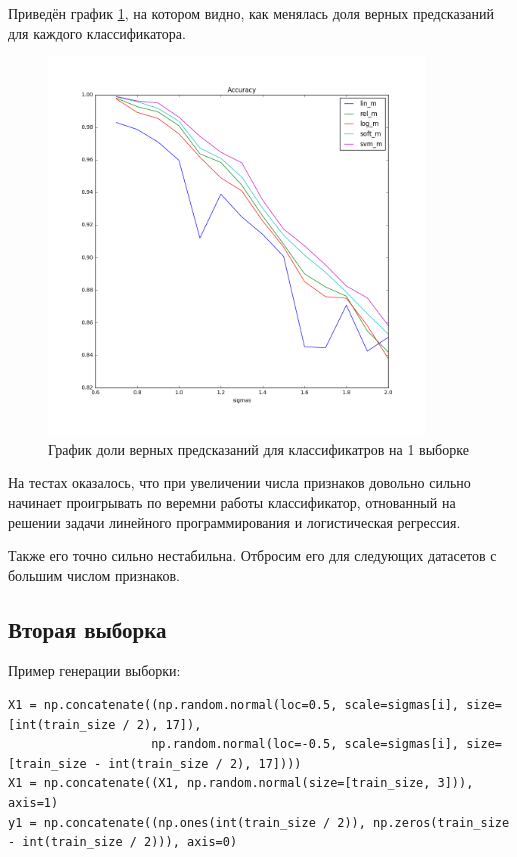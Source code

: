 \documentclass[a4paper]{article}
\begin{document}
Приведён график \ref{pic:im1}, на котором видно, как менялась доля верных предсказаний для каждого классификатора.

\begin{figure}[H]
\centering
\includegraphics[width=10cm]{first_dataset}
\caption{График доли верных предсказаний для классификатров на 1 выборке}
\label{pic:im1}
\end{figure}

На тестах оказалось, что при увеличении числа признаков довольно сильно начинает проигрывать по веремни работы классификатор, отнованный на решении задачи линейного программирования и логистическая регрессия.

Также его точно сильно нестабильна. Отбросим его для следующих датасетов с большим числом признаков.

\subsection{Вторая выборка}

Пример генерации выборки:

\begin{lstlisting}
X1 = np.concatenate((np.random.normal(loc=0.5, scale=sigmas[i], size=[int(train_size / 2), 17]),
                    np.random.normal(loc=-0.5, scale=sigmas[i], size=[train_size - int(train_size / 2), 17]))) 
X1 = np.concatenate((X1, np.random.normal(size=[train_size, 3])), axis=1)
y1 = np.concatenate((np.ones(int(train_size / 2)), np.zeros(train_size - int(train_size / 2))), axis=0)
\end{lstlisting}
\end{document}

